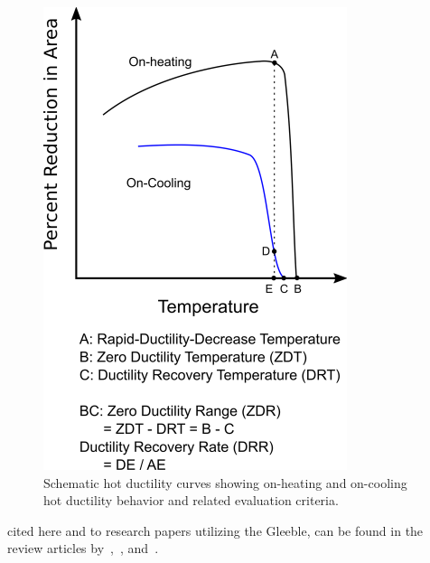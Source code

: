 \begin{figure}
    \centering
    \includegraphics[width=3.5in]{figures/hot-ductility/schematic-hot-ductility-curves.png}
    \caption{Schematic hot ductility curves showing on-heating and on-cooling hot ductility behavior and related evaluation criteria.}
    \label{fig:schematic-hot-ductility-curves}
\end{figure} 
\noindent cited here and to research papers utilizing the Gleeble, can be found in the review articles by~\citet{savage_apparatus_1962},~\citet{lundin_historical_1997}, and~\citet{lundin_standardization_1990_history}. 



